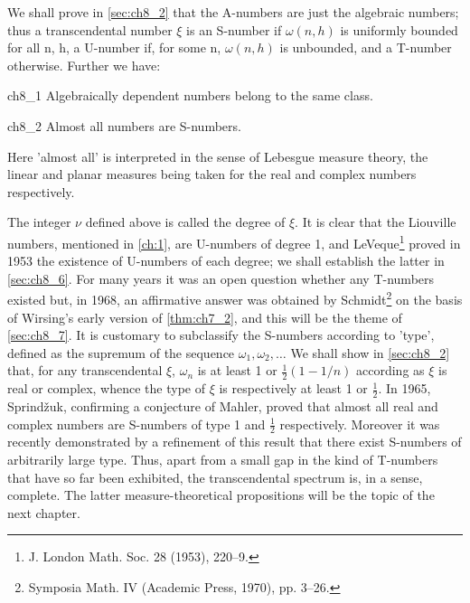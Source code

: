 We shall prove in \autoref{sec:ch8_2} that the A-numbers are just the algebraic numbers; thus a transcendental number  $\xi$  is an S-number if  $\omega(n,h)$  is uniformly bounded for all n, h, a U-number if, for some n,  $\omega(n,h)$  is unbounded, and a T-number otherwise. Further we have:

\begin{mythm}{}{ch8_1}
Algebraically dependent numbers belong to the same class.
\end{mythm}

\begin{mythm}{}{ch8_2}
Almost all numbers are S-numbers.
\end{mythm}

Here 'almost all' is interpreted in the sense of Lebesgue measure theory, the linear and planar measures being taken for the real and complex numbers respectively.

The integer  $\nu$  defined above is called the degree of  $\xi$. It is clear that the Liouville numbers, mentioned in \autoref{ch:1}, are U-numbers of degree 1, and LeVeque\footnote{J. London Math. Soc. 28 (1953), 220--9.} proved in 1953 the existence of U-numbers of each degree; we shall establish the latter in \autoref{sec:ch8_6}. For many years it was an open question whether any T-numbers existed but, in 1968, an affirmative answer was obtained by Schmidt\footnote{Symposia Math. IV (Academic Press, 1970), pp. 3--26.} on the basis of Wirsing's early version of \autoref{thm:ch7_2}, and this will be the theme of \autoref{sec:ch8_7}. It is customary to subclassify the S-numbers according to 'type', defined as the supremum of the sequence  $\omega_1, \omega_2, \ldots$  We shall show in \autoref{sec:ch8_2} that, for any transcendental  $\xi$,  $\omega_n$  is at least 1 or  $\frac{1}{2}(1-1/n)$  according as  $\xi$  is real or complex, whence the type of  $\xi$  is respectively at least 1 or  $\frac{1}{2}$. In 1965, Sprindžuk, confirming a conjecture of Mahler, proved that almost all real and complex numbers are S-numbers of type 1 and  $\frac{1}{2}$ respectively. Moreover it was recently demonstrated by a refinement of this result that there exist S-numbers of arbitrarily large type. Thus, apart from a small gap in the kind of T-numbers that have so far been exhibited, the transcendental spectrum is, in a sense, complete. The latter measure-theoretical propositions will be the topic of the next chapter.


